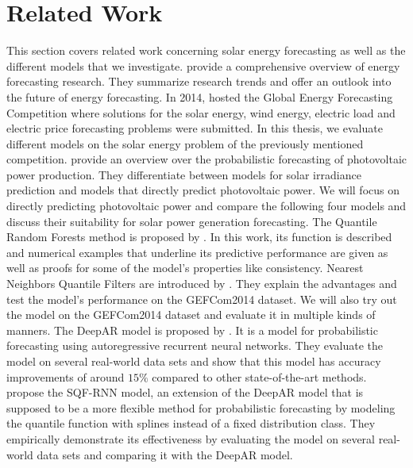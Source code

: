 \section{Related Work}
\label{sec:related-work}

This section covers related work concerning solar energy forecasting as well as 
the different models that we investigate. 
\Textcite{Hong2020} provide a comprehensive 
overview of energy forecasting research. 
They summarize research trends and offer an outlook into the future of energy forecasting. 
In 2014, \Textcite{Hong2016} hosted the Global Energy Forecasting Competition where 
solutions for the solar energy, wind energy, electric load and electric price forecasting 
problems were submitted. 
In this thesis, we evaluate different models on the solar energy problem 
of the previously mentioned competition. 
\Textcite{Meer2018} provide an overview over the probabilistic 
forecasting of photovoltaic power production. They differentiate between models for 
solar irradiance prediction and models that directly predict photovoltaic power. 
We will focus on directly predicting photovoltaic power 
and compare the following four models 
and discuss their suitability for solar power generation forecasting. 
The Quantile Random Forests method is proposed by \Textcite{Meinshausen2006}. 
In this work, its function is described 
and numerical examples that underline its predictive performance are given 
as well as proofs for some of the model's properties like consistency. 
Nearest Neighbors Quantile Filters are introduced by \Textcite{Ordiano2019}. 
They explain the advantages and test the model's performance on the GEFCom2014 dataset. 
We will also try out the model on the GEFCom2014 dataset and evaluate 
it in multiple kinds of manners.
The DeepAR model is proposed by \Textcite{Salinas2017}. 
It is a model for probabilistic forecasting using autoregressive recurrent neural networks. 
They evaluate the model on several 
real-world data sets and show that this model has accuracy improvements of around 
\(15\%\) compared to other state-of-the-art methods. 
\Textcite{Gasthaus2019} propose the SQF-RNN model, an extension of the DeepAR model 
that is supposed to be a more flexible method for probabilistic forecasting 
by modeling the quantile function with splines instead of a fixed distribution class.
They empirically demonstrate its effectiveness by evaluating the model on several real-world 
data sets and comparing it with the DeepAR model.